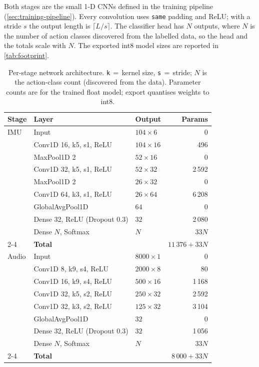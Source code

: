 Both stages are the small 1-D CNNs defined in the training pipeline (\cref{sec:training-pipeline}).
Every convolution uses \texttt{same} padding and ReLU; with a stride $s$ the output length is
$\lceil L/s \rceil$. The classifier head has $N$ outputs, where $N$ is the number of action classes
discovered from the labelled data, so the head and the totals scale with $N$. The exported int8
model sizes are reported in \cref{tab:footprint}.

\begin{table}[ht]
  \centering
  \caption{Per-stage network architecture. \texttt{k}\,$=$\,kernel size, \texttt{s}\,$=$\,stride;
           $N$ is the action-class count (discovered from the data). Parameter counts are for the
           trained float model; export quantises weights to int8.}
  \label{tab:arch}
  \small
  \begin{tabular}{@{}lllr@{}}
    \toprule
    \textbf{Stage} & \textbf{Layer} & \textbf{Output} & \textbf{Params} \\
    \midrule
    IMU
      & Input                          & $104\times6$  & 0 \\
      & Conv1D 16, k5, s1, ReLU        & $104\times16$ & 496 \\
      & MaxPool1D 2                    & $52\times16$  & 0 \\
      & Conv1D 32, k5, s1, ReLU        & $52\times32$  & 2\,592 \\
      & MaxPool1D 2                    & $26\times32$  & 0 \\
      & Conv1D 64, k3, s1, ReLU        & $26\times64$  & 6\,208 \\
      & GlobalAvgPool1D                & $64$          & 0 \\
      & Dense 32, ReLU (Dropout 0.3)   & $32$          & 2\,080 \\
      & Dense $N$, Softmax             & $N$           & $33N$ \\
    \cmidrule(l){2-4}
      & \textbf{Total}                 &               & $11\,376 + 33N$ \\
    \midrule
    Audio
      & Input                          & $8000\times1$ & 0 \\
      & Conv1D 8, k9, s4, ReLU         & $2000\times8$ & 80 \\
      & Conv1D 16, k9, s4, ReLU        & $500\times16$ & 1\,168 \\
      & Conv1D 32, k5, s2, ReLU        & $250\times32$ & 2\,592 \\
      & Conv1D 32, k3, s2, ReLU        & $125\times32$ & 3\,104 \\
      & GlobalAvgPool1D                & $32$          & 0 \\
      & Dense 32, ReLU (Dropout 0.3)   & $32$          & 1\,056 \\
      & Dense $N$, Softmax             & $N$           & $33N$ \\
    \cmidrule(l){2-4}
      & \textbf{Total}                 &               & $8\,000 + 33N$ \\
    \bottomrule
  \end{tabular}
\end{table}

